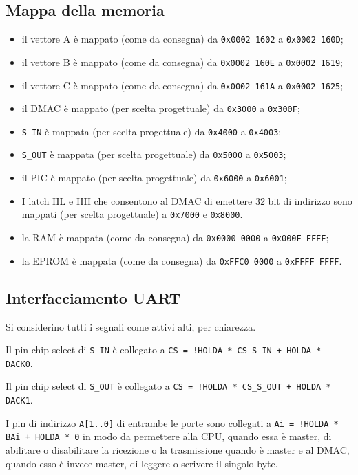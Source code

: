 \documentclass[a4paper]{article}
\begin{document}
\subsection{Mappa della memoria}
\begin{itemize}
\item il vettore A è mappato (come da consegna) da \texttt{0x0002 1602} a \texttt{0x0002 160D};
\item il vettore B è mappato (come da consegna) da \texttt{0x0002 160E} a \texttt{0x0002 1619};
\item il vettore C è mappato (come da consegna) da \texttt{0x0002 161A} a \texttt{0x0002 1625};
\item il DMAC è mappato (per scelta progettuale) da \texttt{0x3000} a \texttt{0x300F};
\item \texttt{S\_IN} è mappata (per scelta progettuale) da \texttt{0x4000} a \texttt{0x4003};
\item \texttt{S\_OUT} è mappata (per scelta progettuale) da \texttt{0x5000} a \texttt{0x5003};
\item il PIC è mappato (per scelta progettuale) da \texttt{0x6000} a \texttt{0x6001};
\item I latch HL e HH che consentono al DMAC di emettere 32 bit di indirizzo sono mappati (per scelta progettuale) a \texttt{0x7000} e \texttt{0x8000}.
\item la RAM è mappata (come da consegna) da \texttt{0x0000 0000} a \texttt{0x000F FFFF};
\item la EPROM è mappata (come da consegna) da \texttt{0xFFC0 0000} a \texttt{0xFFFF FFFF}.
\end{itemize}

\subsection{Interfacciamento UART}
Si considerino tutti i segnali come attivi alti, per chiarezza.

Il pin chip select di \texttt{S\_IN} è collegato a \texttt{CS = !HOLDA * CS\_S\_IN + HOLDA * DACK0}.

Il pin chip select di \texttt{S\_OUT} è collegato a \texttt{CS = !HOLDA * CS\_S\_OUT + HOLDA * DACK1}.

I pin di indirizzo \texttt{A[1..0]} di entrambe le porte sono collegati a \texttt{Ai = !HOLDA * BAi + HOLDA * 0} in modo da permettere alla CPU, quando essa è master, di abilitare o disabilitare la ricezione o la trasmissione quando è master e al DMAC, quando esso è invece master, di leggere o scrivere il singolo byte. 
\end{document}
